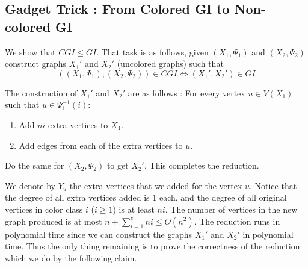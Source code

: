 \subsection{Gadget Trick : From Colored GI to Non-colored GI}

We show that $CGI \le GI$. That task is as follows, given $(X_1,\Psi_1)$ and $(X_2,\Psi_2)$ construct graphs $X_1'$ and $X_2'$ (uncolored graphs) such that 
\[ ((X_1,\Psi_1),(X_2,\Psi_2))\in CGI \iff (X_1',X_2')\in GI \]

The construction of $X_1'$ and $X_2'$ are as follows :
For every vertex $u \in V(X_1)$ such that $u \in \Psi_1^{-1}(i)$:
\begin{enumerate}
\item Add $ni$ extra vertices to $X_1$.
\item Add edges from each of the extra vertices to $u$.
\end{enumerate}
Do the same for $(X_2,\Psi_2)$ to get $X_2'$. This completes the reduction.

We denote by $Y_u$ the extra vertices that we added for the vertex $u$. Notice that the degree of all extra vertices added is $1$ each, and the degree of all original vertices in color class $i$ ($i \ge 1$) is at least $ni$. The number of vertices in the new graph produced is at most $n+\sum_{i=1}^c ni \le O(n^2)$. The reduction runs in polynomial time since we can construct the graphs $X_1'$ and $X_2'$ in polynomial time. Thus the only thing remaining is to prove the correctness of the reduction which we do by the following claim.

